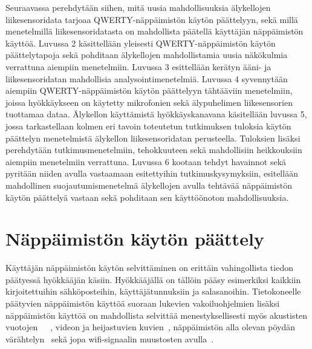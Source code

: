 \documentclass[finnish]{tktltiki2}
\theoremstyle{definition}
\theoremstyle{remark}
\begin{document}
Seuraavassa perehdytään siihen, mitä uusia mahdollisuuksia älykellojen liikesensoridata tarjoaa QWERTY-näppäimistön käytön päättelyyn, sekä millä menetelmillä liikesensoridatasta on mahdollista päätellä käyttäjän näppäimistön käyttöä. 
Luvussa 2 käsittellään yleisesti QWERTY-näppäimistön käytön päättelytapoja sekä pohditaan älykellojen mahdollistamia uusia näkökulmia verrattuna aiempiin menetelmiin. Luvussa 3 esittellään kerätyn ääni- ja liikesensoridatan mahdollisia analysointimenetelmiä. Luvussa 4 syvennytään aiempiin QWERTY-näppäimistön käytön päättelyyn tähtääviin menetelmiin, joissa hyökkäykseen on käytetty mikrofonien sekä älypuhelimen liikesensorien tuottamaa dataa. Älykellon käyttämistä hyökkäyskanavana käsitellään luvussa 5, jossa tarkastellaan kolmen eri tavoin toteutetun tutkimuksen tuloksia käytön päättelyn menetelmistä älykellon liikesensoridatan perusteella. Tuloksien lisäksi perehdytään tutkimusmenetelmiin, tehokkuuteen sekä  mahdollisiin heikkouksiin aiempiin menetelmiin verrattuna. Luvussa 6 kootaan tehdyt havainnot sekä pyritään niiden avulla vastaamaan esitettyihin tutkimuskysymyksiin, esitellään mahdollinen suojautumismenetelmä älykellojen avulla tehtävää näppäimistön käytön päättelyä vastaan sekä pohditaan sen käyttöönoton mahdollisuuksia. 


\pagebreak
\section{Näppäimistön käytön päättely}
Käyttäjän näppäimistön käytön selvittäminen on erittäin vahingollista tiedon päätyessä hyökkääjän käsiin. Hyökkääjällä on tällöin pääsy esimerkiksi kaikkiin kirjoitettuihin sähköposteihin, käyttäjätunnuksiin ja salasanoihin. Tietokoneelle päätyvien näppäimistön käyttöä suoraan lukevien vakoiluohjelmien lisäksi näppäimistön käyttöä on mahdollista selvittää menestyksellisesti myös akustisten vuotojen~\cite{berger}~\cite{zhu}~\cite{aso}, videon ja heijastuvien kuvien~\cite{balz}, näppäimistön alla olevan pöydän värähtelyn~\cite{mar} sekä jopa wifi-signaalin muustosten avulla~\cite{ali}.
\end{document}
